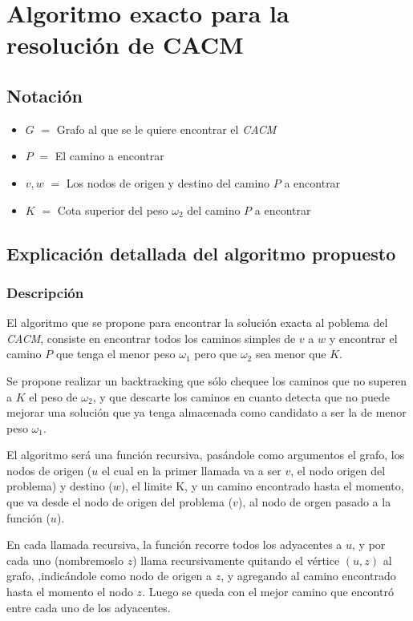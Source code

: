 \section{Algoritmo exacto para la resoluci\'on de CACM}

\subsection{Notaci\'on} \label{exacto:notacion}

\begin{itemize}
	\item $G$ $=$ Grafo al que se le quiere encontrar el \emph{CACM}
	\item $P$ $=$ El camino a encontrar
	\item $v, w$ $=$ Los nodos de origen y destino del camino $P$ a encontrar
	\item $K$ $=$ Cota superior del peso $\omega_2$ del camino $P$ a encontrar
\end{itemize}

\subsection{Explicaci\'on detallada del algoritmo propuesto} \label{exacto:explicacion}

\subsubsection{Descripci\'on}

El algoritmo que se propone para encontrar la soluci\'on exacta al poblema del \emph{CACM}, consiste en encontrar todos los caminos simples de $v$ a $w$
y encontrar el camino $P$ que tenga el menor peso $\omega_1$ pero que $\omega_2$ sea menor que $K$.

Se propone realizar un backtracking que s\'olo chequee los caminos que no superen a $K$ el peso de $\omega_2$, y que descarte los caminos en cuanto
detecta que no puede mejorar una soluci\'on que ya tenga almacenada como candidato a ser la de menor peso $\omega_1$.

El algoritmo ser\'a una funci\'on recursiva, pas\'andole como argumentos el grafo, los nodos de origen ($u$ el cual en la primer llamada va a ser $v$,
el nodo origen del problema) y destino ($w$), el limite K, y un camino encontrado hasta el momento, que va desde el nodo de origen del problema ($v$), al nodo de orgen pasado a la funci\'on ($u$).

En cada llamada recursiva, la funci\'on recorre todos los adyacentes a $u$, y por cada uno (nombremoslo $z$) llama recursivamente quitando el v\'ertice $(u,z)$ al grafo,
,indic\'andole como nodo de origen a $z$, y agregando al camino encontrado hasta el momento el nodo $z$. Luego se queda con el mejor camino que encontr\'o entre cada uno de los adyacentes.

